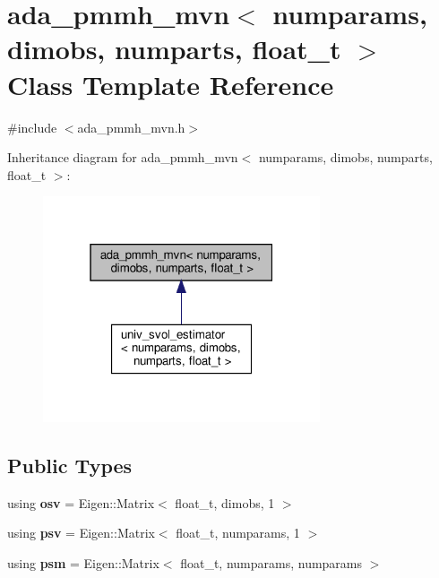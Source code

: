 \hypertarget{classada__pmmh__mvn}{}\section{ada\+\_\+pmmh\+\_\+mvn$<$ numparams, dimobs, numparts, float\+\_\+t $>$ Class Template Reference}
\label{classada__pmmh__mvn}


{\ttfamily \#include $<$ada\+\_\+pmmh\+\_\+mvn.\+h$>$}



Inheritance diagram for ada\+\_\+pmmh\+\_\+mvn$<$ numparams, dimobs, numparts, float\+\_\+t $>$\+:\nopagebreak
\begin{figure}[H]
\begin{center}
\leavevmode
\includegraphics[width=232pt]{classada__pmmh__mvn__inherit__graph}
\end{center}
\end{figure}
\subsection*{Public Types}
\begin{DoxyCompactItemize}
\item 
\mbox{\label{classada__pmmh__mvn_af036f732a29ede6fee08cdaacc9bbaaa}} 
using {\bfseries osv} = Eigen\+::\+Matrix$<$ float\+\_\+t, dimobs, 1 $>$
\item 
\mbox{\label{classada__pmmh__mvn_adb9df4d2086af9cace0f8aeebd805a73}} 
using {\bfseries psv} = Eigen\+::\+Matrix$<$ float\+\_\+t, numparams, 1 $>$
\item 
\mbox{\label{classada__pmmh__mvn_a1cb69e6998319cbe2733965a177dc8d1}} 
using {\bfseries psm} = Eigen\+::\+Matrix$<$ float\+\_\+t, numparams, numparams $>$
\end{DoxyCompactItemize}
